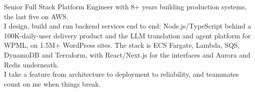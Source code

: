 

\renewcommand{\paragraphstyle}{\fontsize{9.5pt}{1.4em}\bodyfont\upshape\color{darktext}}

\begin{cvparagraph}

Senior Full Stack Platform Engineer with 8+ years building production systems, the last five on AWS.\\ I design, build and run backend services end to end: Node.js/TypeScript behind a 100K-daily-user delivery product and the LLM translation and agent platform for WPML, on 1.5M+ WordPress sites. The stack is ECS Fargate, Lambda, SQS, DynamoDB and Terraform, with React/Next.js for the interfaces and Aurora and Redis underneath.\\ I take a feature from architecture to deployment to reliability, and teammates count on me when things break.
\end{cvparagraph}
